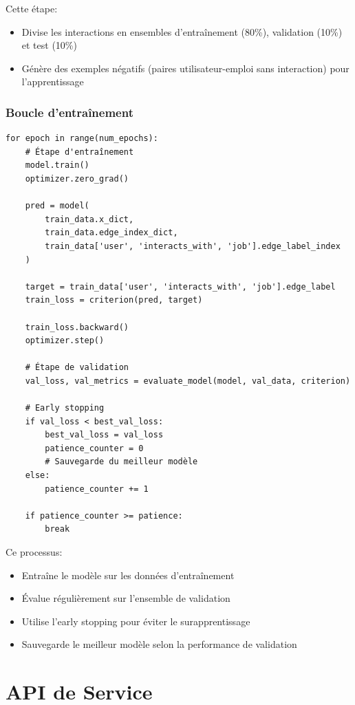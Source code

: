 \documentclass[12pt,a4paper]{article}
\begin{document}
Cette étape:
\begin{itemize}
    \item Divise les interactions en ensembles d'entraînement (80\%), validation (10\%) et test (10\%)
    \item Génère des exemples négatifs (paires utilisateur-emploi sans interaction) pour l'apprentissage
\end{itemize}

\subsubsection{Boucle d'entraînement}

\begin{lstlisting}[caption=Boucle d'entraînement principale]
for epoch in range(num_epochs):
    # Étape d'entraînement
    model.train()
    optimizer.zero_grad()
    
    pred = model(
        train_data.x_dict,
        train_data.edge_index_dict,
        train_data['user', 'interacts_with', 'job'].edge_label_index
    )
    
    target = train_data['user', 'interacts_with', 'job'].edge_label
    train_loss = criterion(pred, target)
    
    train_loss.backward()
    optimizer.step()
    
    # Étape de validation
    val_loss, val_metrics = evaluate_model(model, val_data, criterion)
    
    # Early stopping
    if val_loss < best_val_loss:
        best_val_loss = val_loss
        patience_counter = 0
        # Sauvegarde du meilleur modèle
    else:
        patience_counter += 1
        
    if patience_counter >= patience:
        break
\end{lstlisting}

Ce processus:
\begin{itemize}
    \item Entraîne le modèle sur les données d'entraînement
    \item Évalue régulièrement sur l'ensemble de validation
    \item Utilise l'early stopping pour éviter le surapprentissage
    \item Sauvegarde le meilleur modèle selon la performance de validation
\end{itemize}

\section{API de Service}
\end{document}
